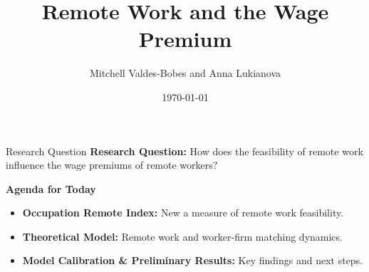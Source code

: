 \documentclass[aspectratio=1610]{beamer}
\title{Remote Work and the Wage Premium}
\author{Mitchell Valdes-Bobes and Anna Lukianova}
\date{\today}
\begin{document}
{
  \begin{frame}
    \titlepage
  \end{frame}
}
\addtocounter{framenumber}{-1}

\begin{frame}{Research Question}
\textbf{Research Question:} How does the feasibility of remote work influence the wage premiums of remote workers?
\vspace{1cm}
\pause

\textbf{Agenda for Today}
\begin{itemize}  
    \item \textbf{Occupation Remote Index:} New a measure of remote work feasibility.
    \item \textbf{Theoretical Model:} Remote work and worker-firm matching dynamics.
    \item \textbf{Model Calibration \& Preliminary Results:} Key findings and next steps. 
\end{itemize}  

\end{frame}  
\end{document}
